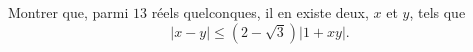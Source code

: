 Montrer que, parmi $13$ réels quelconques, il en existe deux, $x$ et $y$, tels que
\[ |x - y| \leq (2 - \sqrt{3})|1 + xy|. \]
